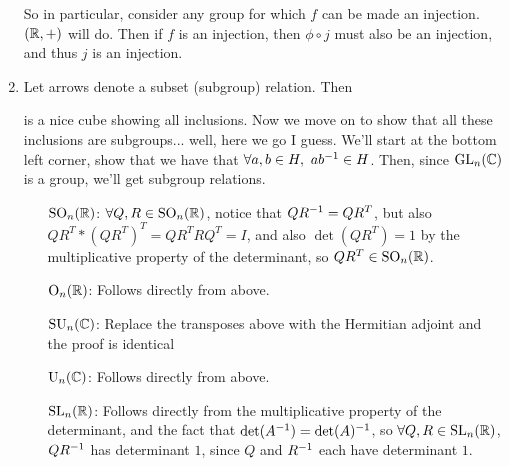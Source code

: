 \documentclass[12pt, twosided]{article}
\begin{document}
\begin{enumerate}
  \begin{center}
  \end{center}
  So in particular, consider any group for which \(f\) can be made an injection. \((\mathbb{R}, +)\) will do. Then if \(f\) is an injection, then \(\phi \circ j\) must also be an injection, and thus \(j\) is an injection.
\item Let arrows denote a subset (subgroup) relation. Then
  \begin{center}
  \end{center}
  is a nice cube showing all inclusions. Now we move on to show that all these inclusions are subgroups... well, here we go I guess. We'll start at the bottom left corner, show that we have that \(\forall a, b \in H,\ ab^{-1} \in H\). Then, since \(\mathrm{GL}_n(\mathbb{C})\) is a group, we'll get subgroup relations.
  \begin{itemize}
  \item [\(\mathrm{SO}_n(\mathbb{R})\):] \(\forall Q, R \in \mathrm{SO}_n(\mathbb{R})\), notice that \(QR^{-1} = QR^T\), but also \(QR^T*(QR^T)^T = QR^TRQ^T = I\), and also \(\det(QR^T) = 1\) by the multiplicative property of the determinant, so \(QR^T \in \mathrm{SO}_n(\mathbb{R})\).
  \item [\(\mathrm{O}_n(\mathbb{R})\):] Follows directly from above.
  \item [\(\mathrm{SU}_n(\mathbb{C})\):] Replace the transposes above with the Hermitian adjoint and the proof is identical
  \item [\(\mathrm{U}_n(\mathbb{C})\):] Follows directly from above.
  \item [\(\mathrm{SL}_n(\mathbb{R})\):] Follows directly from the multiplicative property of the determinant, and the fact that \(\det(A^{-1}) = \det(A)^{-1}\), so \(\forall Q,R \in \mathrm{SL}_n(\mathbb{R})\), \(QR^{-1}\) has determinant \(1\), since \(Q\) and \(R^{-1}\) each have determinant \(1\).

\end{itemize}
\end{enumerate}
\end{document}
